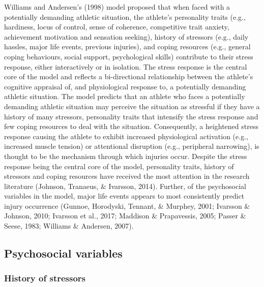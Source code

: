 \documentclass[man,floatsintext]{apa6}
\begin{document}
Williams and Andersen's (1998) model proposed that when faced with a potentially demanding athletic situation, the athlete's personality traits (e.g., hardiness, locus of control, sense of coherence, competitive trait anxiety, achievement motivation and sensation seeking), history of stressors (e.g., daily hassles, major life events, previous injuries), and coping resources (e.g., general coping behaviours, social support, psychological skills) contribute to their stress response, either interactively or in isolation.
The stress response is the central core of the model and reflects a bi-directional relationship between the athlete's cognitive appraisal of, and physiological response to, a potentially demanding athletic situation.
The model predicts that an athlete who faces a potentially demanding athletic situation may perceive the situation as stressful if they have a history of many stressors, personality traits that intensify the stress response and few coping resources to deal with the situation.
Consequently, a heightened stress response causing the athlete to exhibit increased physiological activation (e.g., increased muscle tension) or attentional disruption (e.g., peripheral narrowing), is thought to be the mechanism through which injuries occur.
Despite the stress response being the central core of the model, personality traits, history of stressors and coping resources have received the most attention in the research literature (Johnson, Tranaeus, \& Ivarsson, 2014).
Further, of the psychosocial variables in the model, major life events appears to most consistently predict injury occurrence (Gunnoe, Horodyski, Tennant, \& Murphey, 2001; Ivarsson \& Johnson, 2010; Ivarsson et al., 2017; Maddison \& Prapavessis, 2005; Passer \& Seese, 1983; Williams \& Andersen, 2007).

\hypertarget{psychosocial-variables}{%
\subsection{Psychosocial variables}\label{psychosocial-variables}}

\hypertarget{history-of-stressors}{%
\subsubsection{History of stressors}\label{history-of-stressors}}
\end{document}
